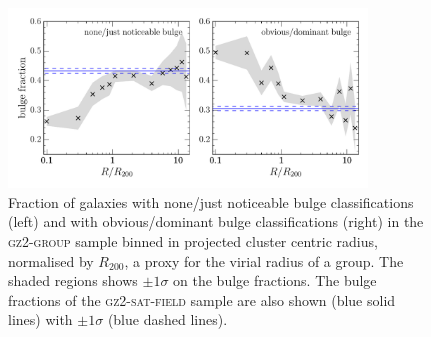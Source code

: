 \documentclass[useAMS,usenatbib]{mn2e}
\begin{document}

\begin{figure}
\includegraphics[width=0.85\textwidth]{min_max_bulge_fraction_trend_with_log_radius_sat_field_cand.pdf}
\caption{Fraction of galaxies with none/just noticeable bulge classifications (left) and with obvious/dominant bulge classifications (right) in the \textsc{gz2-group} sample binned in projected cluster centric radius, normalised by $R_{200}$, a proxy for the virial radius of a group. The shaded regions shows $\pm1\sigma$ on the bulge fractions. The bulge fractions of the \textsc{gz2-sat-field} sample are also shown (blue solid lines) with $\pm1\sigma$ (blue dashed lines).}
\label{fig:bulgeradius}
\end{figure}

\end{document}
